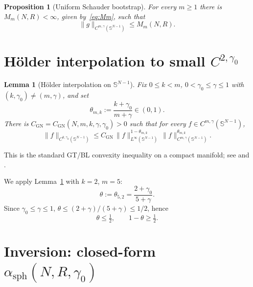 \documentclass[11pt,a4paper]{article}
\newtheorem{proposition}[theorem]{Proposition}
\newtheorem{lemma}[theorem]{Lemma}
\theoremstyle{definition}
\theoremstyle{remark}
\newcommand{\Sph}{\mathbb{S}^{N-1}}
\newcommand{\norm}[1]{\lVert#1\rVert}
\newcommand{\sph}{\mathrm{sph}}
\begin{document}
\begin{proposition}[Uniform Schauder bootstrap]\label{prop:bootstrap}
For every $m\ge 1$ there is $M_{m}(N,R)<\infty$, given by~\eqref{eq:Mm},
such that
\begin{equation}\label{eq:bootstrap}
   \norm{g}_{C^{m,\gamma}(\Sph)}\le M_{m}(N,R).
\end{equation}
\end{proposition}

\section{Hölder interpolation to small $C^{2,\gamma_{0}}$}\label{sec:interp}

\begin{lemma}[Hölder interpolation on $\Sph$]\label{lem:interp}
Fix $0\le k<m$, $0<\gamma_{0}\le\gamma\le1$ with $(k,\gamma_{0})\neq(m,\gamma)$,
and set
\begin{equation}\label{eq:theta}
   \theta_{m,k}:=\frac{k+\gamma_{0}}{m+\gamma}\in(0,1).
\end{equation}
There is $C_{\mathrm{GN}}=C_{\mathrm{GN}}(N,m,k,\gamma,\gamma_{0})>0$ such
that for every $f\in C^{m,\gamma}(\Sph)$,
\begin{equation}\label{eq:interp}
   \norm{f}_{C^{k,\gamma_{0}}(\Sph)}
   \le C_{\mathrm{GN}}\,
       \norm{f}_{L^{\infty}(\Sph)}^{1-\theta_{m,k}}\,
       \norm{f}_{C^{m,\gamma}(\Sph)}^{\theta_{m,k}}.
\end{equation}
\end{lemma}

This is the standard GT/BL convexity inequality on a compact manifold;
see \cite[Lemma~6.32]{GT} and \cite[Theorem~6.4.5]{BL}.

We apply Lemma~\ref{lem:interp} with $k=2$, $m=5$:
\[
   \theta:=\theta_{5,2}=\frac{2+\gamma_{0}}{5+\gamma}.
\]
Since $\gamma_{0}\le\gamma\le1$,
$\theta\le(2+\gamma)/(5+\gamma)\le1/2$, hence
\begin{equation}\label{eq:theta-bound}
   \theta\le\tfrac12,\qquad 1-\theta\ge\tfrac12.
\end{equation}

\section{Inversion: closed-form $\alpha_{\sph}(N,R,\gamma_{0})$}\label{sec:closed-form}
\end{document}
